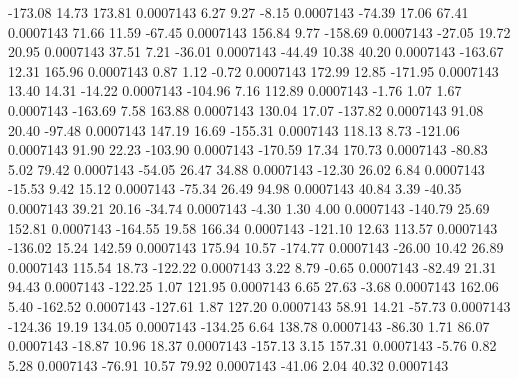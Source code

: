      -173.08       14.73      173.81     0.0007143
        6.27        9.27       -8.15     0.0007143
      -74.39       17.06       67.41     0.0007143
       71.66       11.59      -67.45     0.0007143
      156.84        9.77     -158.69     0.0007143
      -27.05       19.72       20.95     0.0007143
       37.51        7.21      -36.01     0.0007143
      -44.49       10.38       40.20     0.0007143
     -163.67       12.31      165.96     0.0007143
        0.87        1.12       -0.72     0.0007143
      172.99       12.85     -171.95     0.0007143
       13.40       14.31      -14.22     0.0007143
     -104.96        7.16      112.89     0.0007143
       -1.76        1.07        1.67     0.0007143
     -163.69        7.58      163.88     0.0007143
      130.04       17.07     -137.82     0.0007143
       91.08       20.40      -97.48     0.0007143
      147.19       16.69     -155.31     0.0007143
      118.13        8.73     -121.06     0.0007143
       91.90       22.23     -103.90     0.0007143
     -170.59       17.34      170.73     0.0007143
      -80.83        5.02       79.42     0.0007143
      -54.05       26.47       34.88     0.0007143
      -12.30       26.02        6.84     0.0007143
      -15.53        9.42       15.12     0.0007143
      -75.34       26.49       94.98     0.0007143
       40.84        3.39      -40.35     0.0007143
       39.21       20.16      -34.74     0.0007143
       -4.30        1.30        4.00     0.0007143
     -140.79       25.69      152.81     0.0007143
     -164.55       19.58      166.34     0.0007143
     -121.10       12.63      113.57     0.0007143
     -136.02       15.24      142.59     0.0007143
      175.94       10.57     -174.77     0.0007143
      -26.00       10.42       26.89     0.0007143
      115.54       18.73     -122.22     0.0007143
        3.22        8.79       -0.65     0.0007143
      -82.49       21.31       94.43     0.0007143
     -122.25        1.07      121.95     0.0007143
        6.65       27.63       -3.68     0.0007143
      162.06        5.40     -162.52     0.0007143
     -127.61        1.87      127.20     0.0007143
       58.91       14.21      -57.73     0.0007143
     -124.36       19.19      134.05     0.0007143
     -134.25        6.64      138.78     0.0007143
      -86.30        1.71       86.07     0.0007143
      -18.87       10.96       18.37     0.0007143
     -157.13        3.15      157.31     0.0007143
       -5.76        0.82        5.28     0.0007143
      -76.91       10.57       79.92     0.0007143
      -41.06        2.04       40.32     0.0007143
